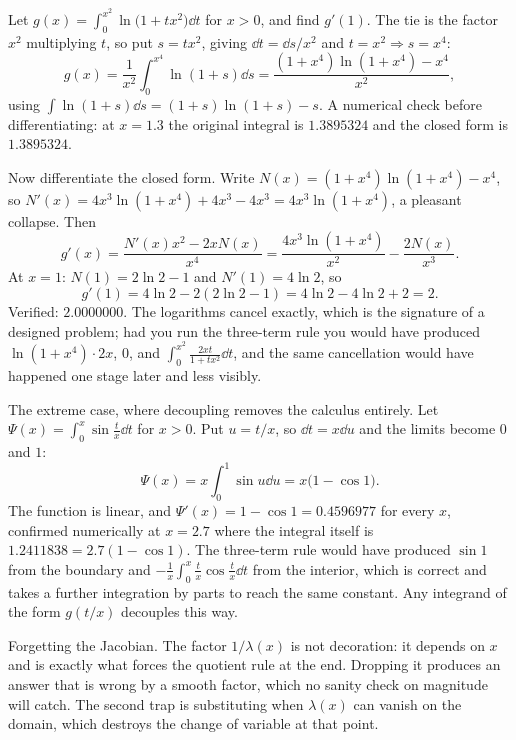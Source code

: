 \begin{worked}
Let $g(x)=\displaystyle\int_{0}^{x^{2}}\ln\bigl(1+tx^{2}\bigr)\dd t$ for $x>0$, and find $g'(1)$. The tie is the factor $x^{2}$ multiplying $t$, so put $s=tx^{2}$, giving $\dd t=\dd s/x^{2}$ and $t=x^{2}\Rightarrow s=x^{4}$:
\[
g(x)=\frac{1}{x^{2}}\int_{0}^{x^{4}}\ln(1+s)\dd s=\frac{(1+x^{4})\ln(1+x^{4})-x^{4}}{x^{2}},
\]
using $\int\ln(1+s)\dd s=(1+s)\ln(1+s)-s$. A numerical check before differentiating: at $x=1.3$ the original integral is $1.3895324$ and the closed form is $1.3895324$.

Now differentiate the closed form. Write $N(x)=(1+x^{4})\ln(1+x^{4})-x^{4}$, so $N'(x)=4x^{3}\ln(1+x^{4})+4x^{3}-4x^{3}=4x^{3}\ln(1+x^{4})$, a pleasant collapse. Then
\[
g'(x)=\frac{N'(x)x^{2}-2xN(x)}{x^{4}}=\frac{4x^{3}\ln(1+x^{4})}{x^{2}}-\frac{2N(x)}{x^{3}} .
\]
At $x=1$: $N(1)=2\ln2-1$ and $N'(1)=4\ln2$, so
\[
g'(1)=4\ln2-2(2\ln2-1)=4\ln2-4\ln2+2=2 .
\]
Verified: $2.0000000$. The logarithms cancel exactly, which is the signature of a designed problem; had you run the three-term rule you would have produced $\ln(1+x^{4})\cdot2x$, $0$, and $\int_{0}^{x^{2}}\frac{2xt}{1+tx^{2}}\dd t$, and the same cancellation would have happened one stage later and less visibly.

The extreme case, where decoupling removes the calculus entirely. Let $\Psi(x)=\displaystyle\int_{0}^{x}\sin\frac{t}{x}\dd t$ for $x>0$. Put $u=t/x$, so $\dd t=x\dd u$ and the limits become $0$ and $1$:
\[
\Psi(x)=x\int_{0}^{1}\sin u\dd u=x\bigl(1-\cos1\bigr).
\]
The function is linear, and $\Psi'(x)=1-\cos1=0.4596977$ for every $x$, confirmed numerically at $x=2.7$ where the integral itself is $1.2411838=2.7(1-\cos1)$. The three-term rule would have produced $\sin1$ from the boundary and $-\frac{1}{x}\int_{0}^{x}\frac{t}{x}\cos\frac tx\dd t$ from the interior, which is correct and takes a further integration by parts to reach the same constant. Any integrand of the form $g(t/x)$ decouples this way.
\end{worked}

\begin{trap}
Forgetting the Jacobian. The factor $1/\lambda(x)$ is not decoration: it depends on $x$ and is exactly what forces the quotient rule at the end. Dropping it produces an answer that is wrong by a smooth factor, which no sanity check on magnitude will catch. The second trap is substituting when $\lambda(x)$ can vanish on the domain, which destroys the change of variable at that point.
\end{trap}

